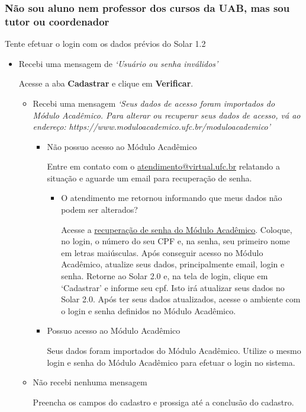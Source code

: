 \documentclass[letterpaper,10pt,english]{sphinxmanual}
\begin{document}
\subsubsection{Não sou aluno nem professor dos cursos da UAB, mas sou tutor ou coordenador}
\label{faq:id2}
Tente efetuar o login com os dados prévios do Solar 1.2
\begin{itemize}
\item {} 
Recebi uma mensagem de \emph{`Usuário ou senha inválidos'}

Acesse a aba \textbf{Cadastrar} e clique em \textbf{Verificar}.
\begin{itemize}
\item {} 
Recebi uma mensagem \emph{`Seus dados de acesso foram importados do Módulo Acadêmico. Para alterar ou recuperar seus dados de acesso, vá ao endereço: https://www.moduloacademico.ufc.br/moduloacademico'}
\begin{itemize}
\item {} 
Não possuo acesso ao Módulo Acadêmico

Entre em contato com o \href{mailto:atendimento@virtual.ufc.br}{atendimento@virtual.ufc.br} relatando a situação e aguarde um email para recuperação de senha.
\begin{itemize}
\item {} 
O atendimento me retornou informando que meus dados não podem ser alterados?

Acesse a \href{https://www.moduloacademico.ufc.br/moduloacademico/guest/recuperarSenhaForm.do}{recuperação de senha do Módulo Acadêmico}. Coloque, no login, o número do seu CPF e, na senha, seu primeiro nome em letras maiúsculas. Após conseguir acesso no Módulo Acadêmico, atualize seus dados, principalmente email, login e senha. Retorne ao Solar 2.0 e, na tela de login, clique em `Cadastrar' e informe seu cpf. Isto irá atualizar seus dados no Solar 2.0. Após ter seus dados atualizados, acesse o ambiente com o login e senha definidos no Módulo Acadêmico.

\end{itemize}

\item {} 
Possuo acesso ao Módulo Acadêmico

Seus dados foram importados do Módulo Acadêmico. Utilize o mesmo login e senha do Módulo Acadêmico para efetuar o login no sistema.

\end{itemize}

\item {} 
Não recebi nenhuma mensagem

Preencha os campos do cadastro e prossiga até a conclusão do cadastro.

\end{itemize}

\end{itemize}
\end{document}
